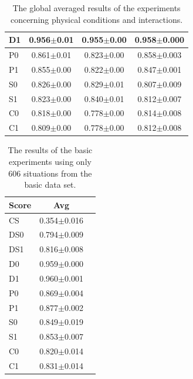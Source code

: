 \begin{table}
\begin{tabular}{||l|c|c|c||}
D1       &0.956$\pm$0.01&0.955$\pm$0.00&0.958$\pm$0.000\\\hline
P0       &0.861$\pm$0.01&0.823$\pm$0.00&0.858$\pm$0.003\\\hline
P1       &0.855$\pm$0.00&0.822$\pm$0.00&0.847$\pm$0.001\\\hline
S0       &0.826$\pm$0.00&0.829$\pm$0.01&0.807$\pm$0.009\\\hline
S1       &0.823$\pm$0.00&0.840$\pm$0.01&0.812$\pm$0.007\\\hline
C0       &0.818$\pm$0.00&0.778$\pm$0.00&0.814$\pm$0.008\\\hline
C1       &0.809$\pm$0.00&0.778$\pm$0.00&0.812$\pm$0.008\\\hline
\hline
\end{tabular}
\caption{The global averaged results of the experiments concerning physical conditions and interactions.}
\label{t:par:int}
\end{table}

\begin{table}[t]
\centering
\begin{tabular}{||l|c|c||}
\hline\hline
Score & Avg\\\hline
CS & 0.354$\pm$0.016\\\hline
DS0 & 0.794$\pm$0.009\\\hline
DS1 & 0.816$\pm$0.008\\\hline
D0 & 0.959$\pm$0.000\\\hline
D1 & 0.960$\pm$0.001\\\hline
P0 & 0.869$\pm$0.004\\\hline
P1 & 0.877$\pm$0.002\\\hline
S0 & 0.849$\pm$0.019\\\hline
S1 & 0.853$\pm$0.007\\\hline
C0 & 0.820$\pm$0.014\\\hline
C1 & 0.831$\pm$0.014\\\hline
\hline
\end{tabular}
\caption{The results of the basic experiments using only 606 situations from the basic data set.}
\label{t:int:basis606}
\end{table}


